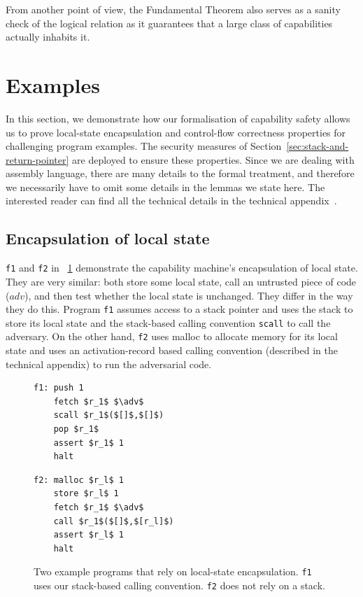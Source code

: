 \documentclass[compsoc,conference,letterpaper,fleqn]{IEEEtran}
\newcommand{\var}[1]{\mathit{#1}}
\newcommand{\adv}{\var{adv}}
\begin{document}
From another point of view, the Fundamental Theorem also serves as a sanity
check of the logical relation as it guarantees that a large class of
capabilities actually inhabits it.

\section{Examples}
\label{sec:examples}
In this section, we demonstrate how our formalisation of capability safety
allows us to prove local-state encapsulation and control-flow correctness
properties for challenging program examples. The security measures of
Section~\ref{sec:stack-and-return-pointer} are deployed to ensure these
properties. Since we are dealing with assembly language, there are many details
to the formal treatment, and therefore we necessarily have to omit some details
in the lemmas we state here. The interested reader can find all the technical
details in the technical appendix~\cite{technical_appendix}.

\subsection{Encapsulation of local state}
\texttt{\footnotesize{f1}} and \texttt{\footnotesize{f2}} in
\figurename~\ref{fig:prog-f1-and-f2} demonstrate the capability machine's
encapsulation of local state. They are very similar: both store some local
state, call an untrusted piece of code ($\adv$), and then test whether the local
state is unchanged. They differ in the way they do this. Program
\texttt{\footnotesize{f1}} assumes access to a stack pointer and uses the stack
to store its local state and the stack-based calling convention
\texttt{\footnotesize{scall}} to call the adversary. On the other hand,
\texttt{\footnotesize{f2}} uses malloc to allocate memory for its local state
and uses an activation-record based calling convention (described in the
technical appendix) to run the adversarial code.

\begin{figure}[t]
  \centering

  \begin{minipage}[t]{4.1cm}
  \begin{lstlisting}
f1: push 1
    fetch $r_1$ $\adv$
    scall $r_1$($[]$,$[]$)
    pop $r_1$
    assert $r_1$ 1
    halt
  \end{lstlisting}
  \end{minipage}
  \begin{minipage}[t]{4.1cm}
  \begin{lstlisting}
f2: malloc $r_l$ 1
    store $r_l$ 1
    fetch $r_1$ $\adv$
    call $r_1$($[]$,$[r_l]$)
    assert $r_l$ 1
    halt
  \end{lstlisting}
  \end{minipage}
  \caption{Two example programs that rely on local-state encapsulation. \texttt{f1} uses our stack-based calling convention. \texttt{f2} does not rely on a stack.}
  \label{fig:prog-f1-and-f2}
\end{figure}
\end{document}
